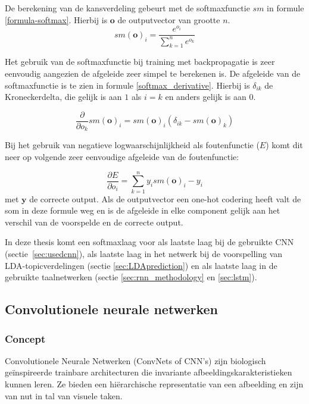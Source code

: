 De berekening van de kansverdeling gebeurt met de softmaxfunctie $sm$ in formule \eqref{formula-softmax}. Hierbij is $\mathbf{o}$ de outputvector van grootte $n$.
\begin{equation}
sm(\textbf{o})_i = \frac{e^{o_i}}{\sum^{n}_{k=1}{e^{o_k}}}
\label{formula-softmax}
\end{equation}

Het gebruik van de softmaxfunctie bij training met backpropagatie is zeer eenvoudig aangezien de afgeleide zeer simpel te berekenen is. De afgeleide van de softmaxfunctie is te zien in formule \eqref{softmax_derivative}. Hierbij is $\delta_{ik}$ de Kroneckerdelta, die gelijk is aan $1$ als $i = k$ en anders gelijk is aan $0$.

\begin{equation}
    \frac{\partial}{\partial o_k}sm(\textbf{o})_i =  sm(\textbf{o})_i(\delta_{ik} - sm(\textbf{o})_k)
    \label{softmax_derivative}
\end{equation}

Bij het gebruik van negatieve logwaarschijnlijkheid als foutenfunctie ($E$) komt dit neer op volgende zeer eenvoudige afgeleide van de foutenfunctie:

\begin{equation}
    \frac{\partial E}{\partial o_i} = \sum_{k=1}^n{y_i}sm(\textbf{o})_i - y_i
\end{equation}
met $\textbf{y}$ de correcte output. Als de outputvector een one-hot codering heeft valt de som in deze formule weg en is de afgeleide in elke component gelijk aan het verschil van de voorspelde en de correcte output\cite{Bishop:1995:NNP:525960}. 

In deze thesis komt een softmaxlaag voor als laatste laag bij de gebruikte CNN \mbox{(sectie \ref{sec:usedcnn})}, als laatste laag in het netwerk bij de voorspelling van LDA-topicverde\-lingen (sectie \ref{sec:LDAprediction}) en als laatste laag in de gebruikte taalnetwerken (sectie \ref{sec:rnn_methodology} en \ref{sec:lstm}).

\subsection{Convolutionele neurale netwerken}
\label{sec:CNN}
\subsubsection{Concept}
Convolutionele Neurale Netwerken (ConvNets of CNN's) zijn biologisch ge\" inspireerde trainbare architecturen die invariante afbeeldingskarakteristieken kunnen leren\cite{LeCun2010}. Ze bieden een hi\"erarchische representatie van een afbeelding en zijn van nut in tal van visuele taken\cite{Ciresan2012,Girshick2014,Zhou2015}.

